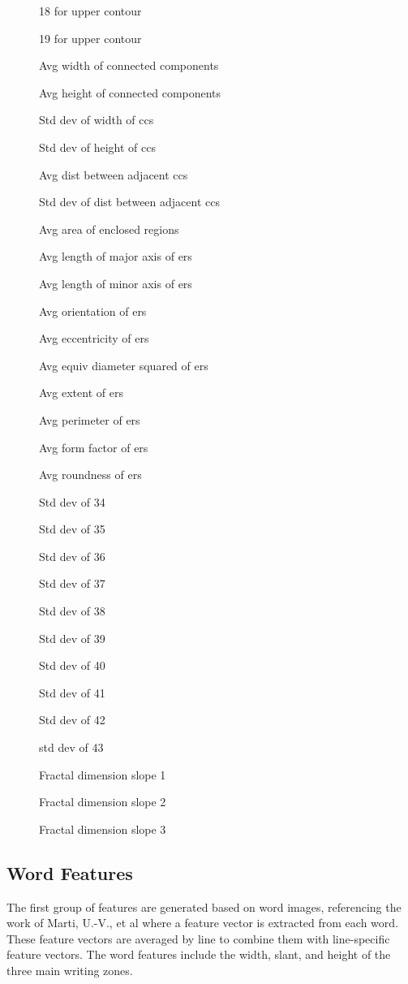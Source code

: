 \documentclass[paper=a4, fontsize=11pt]{scrartcl} %
\numberwithin{equation}{section} %
\numberwithin{figure}{section} %
\numberwithin{table}{section} %
\begin{document}
\begin{figure}
\begin{multicols}{3}
\begin{enumerate*}
    \item 18 for upper contour
    \item 19 for upper contour
    \item Avg width of connected components
    \item Avg height of connected components
    \item Std dev of width of ccs
    \item Std dev of height of ccs
    \item Avg dist between adjacent ccs
    \item Std dev of dist between adjacent ccs
    \item Avg area of enclosed regions
    \item Avg length of major axis of ers
    \item Avg length of minor axis of ers
    \item Avg orientation of ers
    \item Avg eccentricity of ers
    \item Avg equiv diameter squared of ers
    \item Avg extent of ers
    \item Avg perimeter of ers
    \item Avg form factor of ers
    \item Avg roundness of ers
    \item Std dev of 34
    \item Std dev of 35
    \item Std dev of 36
    \item Std dev of 37
    \item Std dev of 38
    \item Std dev of 39
    \item Std dev of 40
    \item Std dev of 41
    \item Std dev of 42
    \item std dev of 43
    \item Fractal dimension slope 1
    \item Fractal dimension slope 2
    \item Fractal dimension slope 3
    \end{enumerate*}
  \end{multicols}
\end{figure}

\subsection{Word Features}
The first group of features are generated based on word images,
referencing the work of Marti, U.-V., et al \cite{WriterID} where a
feature vector is extracted from each word. These feature vectors are
averaged by line to combine them with line-specific feature
vectors. The word features include the width, slant, and height of the
three main writing zones.
\end{document}
